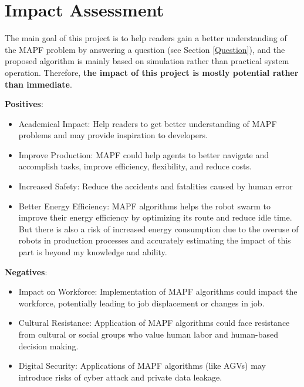 \documentclass[12pt, oneside]{article}
\begin{document}
\pagebreak

\section{Impact Assessment}
The main goal of this project is to help readers gain a better understanding of the MAPF problem by answering a question (see Section \ref{Question}), and the proposed algorithm is mainly based on simulation rather than practical system operation. Therefore, \textbf{the impact of this project is mostly potential rather than immediate}.

\vspace{0.5cm}
\textbf{Positives}:

\begin{itemize}
    \item Academical Impact: Help readers to get better understanding of MAPF problems and may provide inspiration to developers.
    \item Improve Production: MAPF could help agents to better navigate and accomplish tasks, improve efficiency, flexibility, and reduce costs.
    \item Increased Safety: Reduce the accidents and fatalities caused by human error
    \item Better Energy Efficiency: MAPF algorithms helps the robot swarm to improve their energy efficiency by optimizing its route and reduce idle time. But there is also a risk of increased energy consumption due to the overuse of robots in production processes and accurately estimating the impact of this part is beyond my knowledge and ability. 
\end{itemize}


\textbf{Negatives}:

\begin{itemize}
    \item Impact on Workforce: Implementation of MAPF algorithms could impact the workforce, potentially leading to job displacement or changes in job.
    \item Cultural Resistance: Application of MAPF algorithms could face resistance from cultural or social groups who value human labor and human-based decision making.
    \item Digital Security: Applications of MAPF algorithms (like AGVs) may introduce risks of cyber attack and private data leakage. 
\end{itemize}
\end{document}
